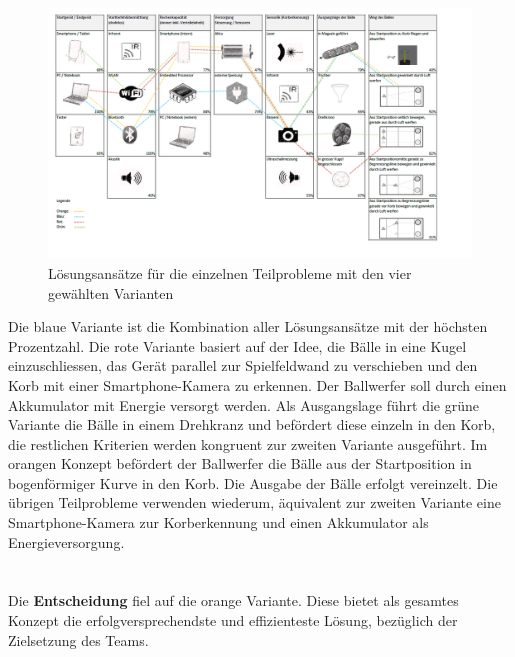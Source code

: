 \\
\newpage
\begin{figure}[h!]
	\centering
	\includegraphics[width=1\textwidth]{Enddokumentation/Varianten/Bilder/Grobkonzept.png}
	\caption{Lösungsansätze für die einzelnen Teilprobleme mit den vier gewählten Varianten}
	\label{fig:Grobkonzept}
\end{figure}
Die blaue Variante ist die Kombination aller Lösungsansätze mit der höchsten Prozentzahl. Die rote Variante basiert auf der Idee, die Bälle in eine Kugel einzuschliessen, das Gerät parallel zur Spielfeldwand zu verschieben und den Korb mit einer Smartphone-Kamera zu erkennen. Der Ballwerfer soll durch einen Akkumulator mit Energie versorgt werden. Als Ausgangslage führt die grüne Variante die Bälle in einem Drehkranz und befördert diese einzeln in den Korb, die restlichen Kriterien werden kongruent zur zweiten Variante ausgeführt. Im orangen Konzept befördert der Ballwerfer die Bälle aus der Startposition in bogenförmiger Kurve in den Korb. Die Ausgabe der Bälle erfolgt vereinzelt. Die übrigen Teilprobleme verwenden wiederum, äquivalent zur zweiten Variante eine Smartphone-Kamera zur Korberkennung und einen Akkumulator als Energieversorgung.\\
\\\\
Die \textbf{Entscheidung} fiel auf die orange Variante. Diese bietet als gesamtes Konzept die erfolgversprechendste und effizienteste Lösung, bezüglich der Zielsetzung des Teams. \\

